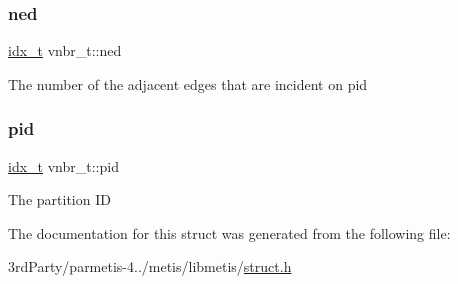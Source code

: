 \subsubsection{\texorpdfstring{ned}{ned}}
{\footnotesize\ttfamily \hyperlink{3rd_party_2parmetis-4_80_83_2metis_2include_2metis_8h_aaa5262be3e700770163401acb0150f52}{idx\+\_\+t} vnbr\+\_\+t\+::ned}

The number of the adjacent edges that are incident on pid \mbox{\label{structvnbr__t_a93adf79b4e57cd0477e9afc9b25da653}} 
\subsubsection{\texorpdfstring{pid}{pid}}
{\footnotesize\ttfamily \hyperlink{3rd_party_2parmetis-4_80_83_2metis_2include_2metis_8h_aaa5262be3e700770163401acb0150f52}{idx\+\_\+t} vnbr\+\_\+t\+::pid}

The partition ID 

The documentation for this struct was generated from the following file\+:\begin{DoxyCompactItemize}
\item 
3rd\+Party/parmetis-\/4../metis/libmetis/\hyperlink{metis_2libmetis_2struct_8h}{struct.\+h}\end{DoxyCompactItemize}
